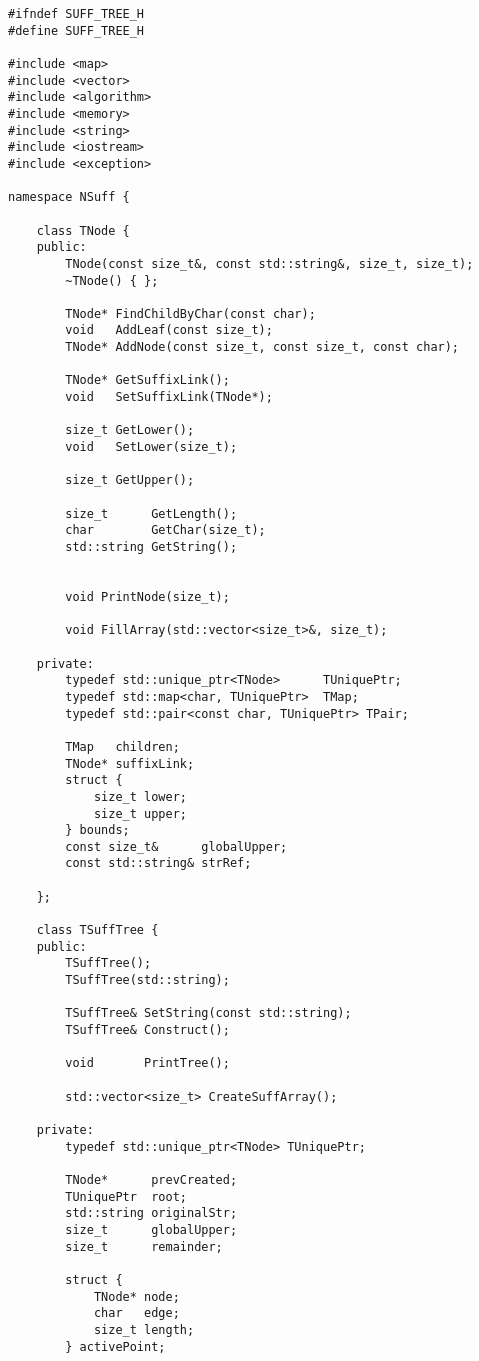 \documentclass[12pt]{article}
\begin{document}
\begin{verbatim}
#ifndef SUFF_TREE_H
#define SUFF_TREE_H

#include <map>
#include <vector>
#include <algorithm>
#include <memory>
#include <string>
#include <iostream>
#include <exception>

namespace NSuff {
    
    class TNode {
    public:
        TNode(const size_t&, const std::string&, size_t, size_t);
        ~TNode() { };

        TNode* FindChildByChar(const char);
        void   AddLeaf(const size_t);
        TNode* AddNode(const size_t, const size_t, const char);

        TNode* GetSuffixLink();
        void   SetSuffixLink(TNode*);

        size_t GetLower();
        void   SetLower(size_t);

        size_t GetUpper();

        size_t      GetLength();
        char        GetChar(size_t);
        std::string GetString();


        void PrintNode(size_t);

        void FillArray(std::vector<size_t>&, size_t);

    private:
        typedef std::unique_ptr<TNode>      TUniquePtr;
        typedef std::map<char, TUniquePtr>  TMap;
        typedef std::pair<const char, TUniquePtr> TPair;

        TMap   children;
        TNode* suffixLink;
        struct {
            size_t lower;
            size_t upper;
        } bounds;
        const size_t&      globalUpper;
        const std::string& strRef;

    };

    class TSuffTree {
    public:
        TSuffTree();
        TSuffTree(std::string);

        TSuffTree& SetString(const std::string);
        TSuffTree& Construct();

        void       PrintTree();

        std::vector<size_t> CreateSuffArray();

    private:
        typedef std::unique_ptr<TNode> TUniquePtr;
     
        TNode*      prevCreated;
        TUniquePtr  root;
        std::string originalStr;
        size_t      globalUpper;
        size_t      remainder;

        struct {
            TNode* node;
            char   edge;
            size_t length;
        } activePoint;


\end{verbatim}
\end{document}

